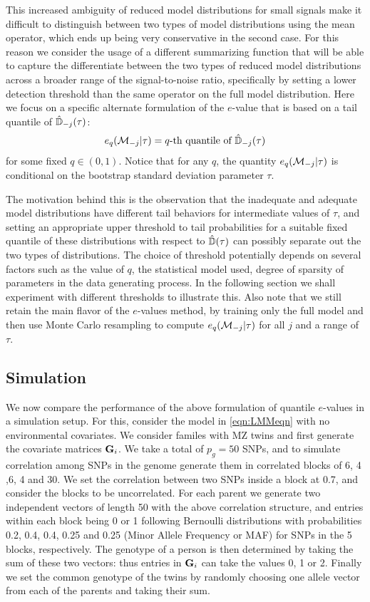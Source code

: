 This increased ambiguity of reduced model distributions for small signals make it difficult to distinguish between two types of model distributions using the mean operator, which ends up being very conservative in the second case. For this reason we consider the usage of a different summarizing function that will be able to capture the differentiate between the two types of reduced model distributions across a broader range of the signal-to-noise ratio, specifically by setting a lower detection threshold than the same operator on the full model distribution. Here we focus on a specific alternate formulation of the $e$-value that is based on a tail quantile of $\hat {{\mathbb{D}}}_{-j} (\tau)$:
%
\begin{align}
e_q ({\cal{M}}_{-j} | \tau) = q \text{-th quantile of } \hat {{\mathbb{D}}}_{-j} (\tau)
\end{align}
%
for some fixed $q \in (0,1)$. Notice that for any $q$, the quantity $e_q ({\cal{M}}_{-j} | \tau)$ is conditional on the bootstrap standard deviation parameter $\tau$.

The motivation behind this is the observation that the inadequate and adequate model distributions have different tail behaviors for intermediate values of $\tau$, and setting an appropriate upper threshold to tail probabilities for a suitable fixed quantile of these distributions with respect to $\hat {{\mathbb{D}}}(\tau)$ can possibly separate out the two types of distributions. The choice of threshold potentially depends on several factors such as the value of $q$, the statistical model used, degree of sparsity of parameters in the data generating process. In the following section we shall experiment with different thresholds to illustrate this.
Also note that we still retain the main flavor of the $e$-values method, by training only the full model and then use Monte Carlo resampling to compute $e_q ({\cal{M}}_{-j} | \tau)$ for all $j$ and a range of $\tau$.

\subsection{Simulation}
\label{sec:SimSection}

We now compare the performance of the above formulation of quantile $e$-values in a simulation setup. For this, consider the model in \ref{eqn:LMMeqn} with no environmental covariates. We consider familes with MZ twins and first generate the covariate matrices ${\mathbf{G}}_i$. We take a total of $p_g = 50$ SNPs, and to simulate correlation among SNPs in the genome generate them in correlated blocks of 6, 4 ,6, 4 and 30. We set the correlation between two SNPs inside a block at 0.7, and consider the blocks to be uncorrelated. For each parent we generate two independent vectors of length 50 with the above correlation structure, and entries within each block being 0 or 1 following Bernoulli distributions with probabilities 0.2, 0.4, 0.4, 0.25 and 0.25 (Minor Allele Frequency or MAF) for SNPs in the 5 blocks, respectively. The genotype of a person is then determined by taking the sum of these two vectors: thus entries in ${\mathbf{G}}_i$ can take the values 0, 1 or 2. Finally we set the common genotype of the twins by randomly choosing one allele vector from each of the parents and taking their sum.

